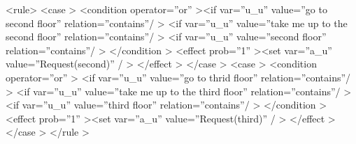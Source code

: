 \documentclass[a4paper, 12pt]{article}
\begin{document}
  \textless rule\textgreater \newline
  \indent \indent \textless  case \textgreater \newline
  \indent \indent \indent \textless condition operator=”or”  \textgreater \newline\indent \indent \indent \indent \textless if var=”u\_u” value=”go to second floor” relation=”contains”/  \textgreater \newline
  \indent \indent \indent \indent \textless if var=”u\_u” value=”take me up to the second floor” \newline
  \indent \indent \indent \indent relation=”contains”/ \textgreater \newline
  \indent  \indent \indent \indent \textless if var=”u\_u” value=”second floor” relation=”contains”/ \textgreater \newline
  \indent \indent \indent \textless /condition \textgreater \newline
  \indent \indent \indent \textless effect prob=”1” \textgreater \textless set var=”a\_u” value=”Request(second)” / \textgreater \newline
  \indent \indent \indent \textless /effect \textgreater \newline
  \indent \indent \textless /case \textgreater \newline
  \indent \indent \textless case \textgreater \newline
  \indent \indent \indent \textless condition operator=”or” \textgreater \newline
  \indent \indent \indent \indent \textless if var=”u\_u” value=”go to thrid floor” relation=”contains”/ \textgreater \newline
  \indent \indent \indent \indent \textless if var=”u\_u” value=”take me up to the third floor” relation=”contains”/ \textgreater \newline
  \indent \indent \indent \indent \textless if var=”u\_u” value=”third floor” relation=”contains”/ \textgreater \newline
   \indent \indent \indent \textless /condition \textgreater \newline
   \indent \indent  \textless effect prob=”1” \textgreater \textless set var=”a\_u” value=”Request(third)” / \textgreater \newline
   \indent \indent  \textless /effect \textgreater \newline
   \indent \indent \textless /case \textgreater \newline
   \indent \textless /rule \textgreater \newline
\end{document}
